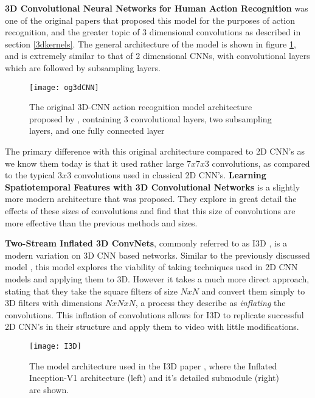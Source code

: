 \textbf{3D Convolutional Neural Networks for Human Action Recognition} \cite{3DCNN-ActionRecognition} was one of the original papers that proposed this model for the purposes of action recognition, and the greater topic of 3 dimensional convolutions as described in section \ref{3dkernels}. The general architecture of the model is shown in figure \ref{fig:original3dcnn}, and is extremely similar to that of 2 dimensional CNNs, with convolutional layers which are followed by subsampling layers.

\begin{figure}[h]
	\texttt{[image: og3dCNN]}
	\centering
	\caption{The original 3D-CNN action recognition model architecture proposed by \cite{3DCNN-ActionRecognition}, containing 3 convolutional layers, two subsampling layers, and one fully connected layer}
	\label{fig:original3dcnn}
\end{figure}

The primary difference with this original architecture compared to 2D CNN's as we know them today is that it used rather large $7x7x3$ convolutions, as compared to the typical $3x3$ convolutions used in classical 2D CNN's. \textbf{Learning Spatiotemporal Features with 3D Convolutional Networks} \cite{3x33dcnn} is a slightly more modern architecture that was proposed. They explore in great detail the effects of these sizes of convolutions and find that this size of convolutions are more effective than the previous methods and sizes.

\textbf{Two-Stream Inflated 3D ConvNets}, commonly referred to as I3D \cite{i3d}, is a modern variation on 3D CNN based networks. Similar to the previously discussed model \cite{3DCNN-ActionRecognition}, this model explores the viability of taking techniques used in 2D CNN models and applying them to 3D. However it takes a much more direct approach, stating that they take the square filters of size $NxN$ and convert them simply to 3D filters with dimensions $NxNxN$, a process they describe as \textit{inflating} the convolutions. This inflation of convolutions allows for I3D to replicate successful 2D CNN's in their structure and apply them to video with little modifications.

\begin{figure}[h]
	\texttt{[image: I3D]}
	\centering
	\caption{The model architecture used in the I3D paper \cite{i3d}, where the Inflated Inception-V1 architecture (left) and it's detailed submodule (right) are shown.}
	\label{fig:I3D}
\end{figure}

